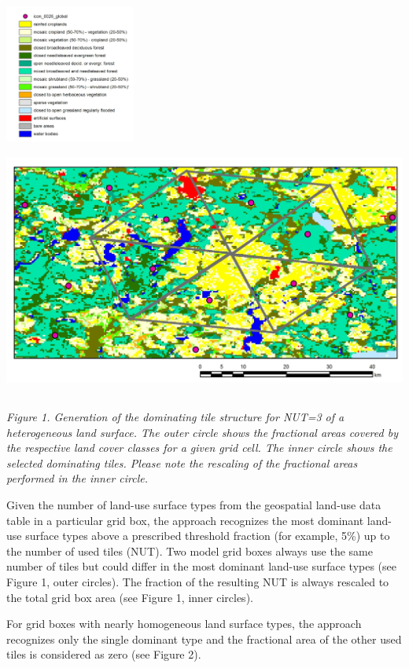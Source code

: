 \includegraphics[width=1.6875in,height=1.79583in]{../tex/extracted-media/media/image2.png}\includegraphics[width=6.67153in,height=3.30764in]{../tex/extracted-media/media/image4.png}

\emph{Figure 1. Generation of the dominating tile structure for NUT=3 of a heterogeneous land surface. The outer circle shows the fractional areas covered by the respective land cover classes for a given grid cell. The inner circle shows the selected dominating tiles. Please note the rescaling of the fractional areas performed in the inner circle.}

Given the number of land-use surface types from the geospatial land-use data table in a particular grid box, the approach recognizes the most dominant land-use surface types above a prescribed threshold fraction (for example, 5\%) up to the number of used tiles (NUT). Two model grid boxes always use the same number of tiles but could differ in the most dominant land-use surface types (see Figure 1, outer circles). The fraction of the resulting NUT is always rescaled to the total grid box area (see Figure 1, inner circles).

For grid boxes with nearly homogeneous land surface types, the approach recognizes only the single dominant type and the fractional area of the other used tiles is considered as zero (see Figure 2).

